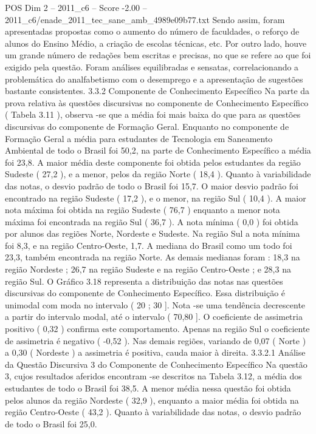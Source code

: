 \begin{textsample}{POS Dim 2 – 2011\_c6 – Score -2.00 – 2011\_c6/enade\_2011\_tec\_sane\_amb\_4989e09b77.txt}
Sendo assim, foram apresentadas propostas como o aumento do número de faculdades, o reforço de alunos do Ensino Médio, a criação de escolas técnicas, etc.
Por outro lado, houve um grande número de redações bem escritas e precisas, no que se refere ao que foi exigido pela questão.
Foram análises equilibradas e sensatas, correlacionando a problemática do analfabetismo com o desemprego e a apresentação de sugestões bastante consistentes. 3.3.2 Componente de Conhecimento Específico Na parte da prova relativa às questões discursivas no componente de Conhecimento Específico ( Tabela 3.11 ), observa -se que a média foi mais baixa do que para as questões discursivas do componente de Formação Geral.
Enquanto no componente de Formação Geral a média para estudantes de Tecnologia em Saneamento Ambiental de todo o Brasil foi 50,2, na parte de Conhecimento Específico a média foi 23,8.
A maior média deste componente foi obtida pelos estudantes da região Sudeste ( 27,2 ), e a menor, pelos da região Norte ( 18,4 ).
Quanto à variabilidade das notas, o desvio padrão de todo o Brasil foi 15,7.
O maior desvio padrão foi encontrado na região Sudeste ( 17,2 ), e o menor, na região Sul ( 10,4 ).
A maior nota máxima foi obtida na região Sudeste ( 76,7 ) enquanto a menor nota máxima foi encontrada na região Sul ( 36,7 ).
A nota mínima ( 0,0 ) foi obtida por alunos das regiões Norte, Nordeste e Sudeste.
Na região Sul a nota mínima foi 8,3, e na região Centro-Oeste, 1,7.
A mediana do Brasil como um todo foi 23,3, também encontrada na região Norte.
As demais medianas foram : 18,3 na região Nordeste ; 26,7 na região Sudeste e na região Centro-Oeste ; e 28,3 na região Sul.
O Gráfico 3.18 representa a distribuição das notas nas questões discursivas do componente de Conhecimento Específico.
Essa distribuição é unimodal com moda no intervalo ( 20 ; 30 ].
Nota -se uma tendência decrescente a partir do intervalo modal, até o intervalo ( 70,80 ].
O coeficiente de assimetria positivo ( 0,32 ) confirma este comportamento.
Apenas na região Sul o coeficiente de assimetria é negativo ( -0,52 ).
Nas demais regiões, variando de 0,07 ( Norte ) a 0,30 ( Nordeste ) a assimetria é positiva, cauda maior à direita. 3.3.2.1 Análise da Questão Discursiva 3 do Componente de Conhecimento Específico Na questão 3, cujos resultados aferidos encontram -se descritos na Tabela 3.12, a média dos estudantes de todo o Brasil foi 38,5.
A menor média nessa questão foi obtida pelos alunos da região Nordeste ( 32,9 ), enquanto a maior média foi obtida na região Centro-Oeste ( 43,2 ).
Quanto à variabilidade das notas, o desvio padrão de todo o Brasil foi 25,0.

\end{textsample}

